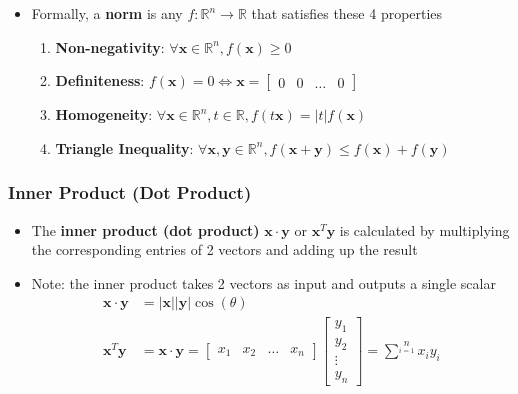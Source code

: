 \documentclass[letterpaper,12pt]{article}
\newcommand{\vect}[1]{\mathbf{#1}}
\newcommand{\abs}[1]{\lvert#1\rvert}
\begin{document}
\begin{itemize}
 \item Formally, a \textbf{norm} is any $f: \mathbb{R}^n \to \mathbb{R}$ that satisfies these 4 properties
       \begin{enumerate}
        \item \textbf{Non-negativity}: $\forall \vect{x} \in \mathbb{R}^n, f(\vect{x}) \geq 0$
        \item \textbf{Definiteness}: $f(\vect{x}) = 0 \iff \vect{x} = \begin{bmatrix}
                0 & 0 & \dots & 0
               \end{bmatrix}$
        \item \textbf{Homogeneity}: $\forall \vect{x} \in \mathbb{R}^n, t \in \mathbb{R}, f(t\vect{x}) = \abs{t}f(\vect{x})$
        \item \textbf{Triangle Inequality}: $\forall \vect{x}, \vect{y} \in \mathbb{R}^n, f(\vect{x}+\vect{y}) \leq f(\vect{x}) + f(\vect{y})$
       \end{enumerate}
\end{itemize}

\subsubsection{Inner Product (Dot Product)}
\begin{itemize}
 \item The \textbf{inner product (dot product)} $\vect{x} \cdot \vect{y}$ or $\vect{x}^T \vect{y}$ is calculated by multiplying the corresponding entries of 2 vectors and adding up the result
 \item Note: the inner product takes 2 vectors as input and outputs a single scalar
       \begin{align}
        \vect{x} \cdot \vect{y} & = \abs{\vect{x}}\abs{\vect{y}}\cos(\theta) \\
        \vect{x}^T \vect{y}     & = \vect{x} \cdot \vect{y} =
        \begin{bmatrix}
         x_1 & x_2 & \dots & x_n
        \end{bmatrix}
        \begin{bmatrix}
         y_{1}  \\
         y_{2}  \\
         \vdots \\
         y_{n}
        \end{bmatrix}
        = \sum\limits^{n}\limits_{i=1} x_i y_i
       \end{align}
\end{itemize}
\end{document}
